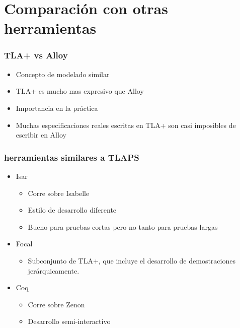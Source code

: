 \documentclass[12pt]{beamer}
\newenvironment{stepitemize}{\begin{itemize}[<+->]}{\end{itemize} }
\begin{document}
\begin{frame}
\end{frame}

\section{Comparación con otras herramientas}
\begin{frame}


\frametitle{TLA+ vs Alloy}
    \begin{itemize}
      \item Concepto de modelado similar
      \item TLA+ es mucho mas expresivo que Alloy
      \item Importancia en la práctica
      \item Muchas especificaciones reales escritas en TLA+ son casi imposibles de escribir en Alloy
    \end{itemize}

\end{frame}

\begin{frame}

  \frametitle{herramientas similares a TLAPS}
  \begin{stepitemize}
	  \item Isar
	  \begin{itemize}
	    \item Corre sobre Isabelle
	    \item Estilo de desarrollo diferente
	    \item Bueno para pruebas cortas pero no tanto para pruebas largas
	   \end{itemize}
	   \item Focal
	    \begin{itemize}
	     \item Subconjunto de TLA+, que incluye el desarrollo de demostraciones jerárquicamente. 
	    \end{itemize}
	   \item Coq
	   \begin{itemize}
	    \item Corre sobre Zenon
	    \item Desarrollo semi-interactivo
	   \end{itemize}

	    

  \end{stepitemize}


\end{frame}
\end{document}
